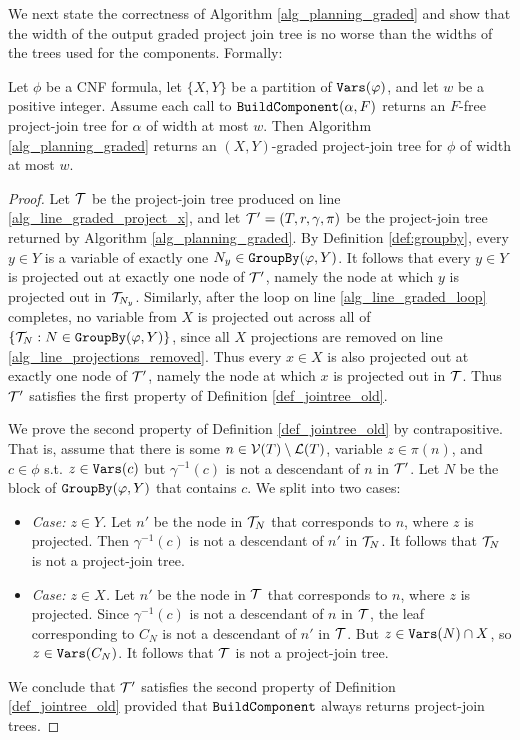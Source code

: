 We next state the correctness of Algorithm \ref{alg_planning_graded} and show that the width of the output graded project join tree is no worse than the widths of the trees used for the components. Formally:
\begin{theorem}
\label{thm:planning_graded_correctness}
Let $\phi$ be a CNF formula, let $\{X, Y\}$ be a partition of $\texttt{\upshape Vars}(\varphi)$, and let $w$ be a positive integer. 
Assume each call to $\texttt{\upshape BuildComponent}(\alpha, F)$ returns an $F$-free project-join tree for $\alpha$ of width at most $w$. 
Then Algorithm \ref{alg_planning_graded} returns an $(X,Y)$-graded project-join tree for $\phi$ of width at most $w$.
\end{theorem}
\begin{proof}
Let $\mathcal{T}$ be the project-join tree produced on line \ref{alg_line_graded_project_x}, and let $\mathcal{T}' = (T, r, \gamma, \pi)$ be the project-join tree returned by Algorithm \ref{alg_planning_graded}. 
By Definition \ref{def:groupby}, every $y \in Y$ is a variable of exactly one $N_y \in \texttt{\upshape GroupBy}(\varphi, Y)$. It follows that every $y \in Y$ is projected out at exactly one node of $\mathcal{T}'$, namely the node at which $y$ is projected out in $\mathcal{T}_{N_y}$. Similarly, after the loop on line \ref{alg_line_graded_loop} completes, no variable from $X$ is projected out across all of $\{\mathcal{T}_N : N \in \texttt{\upshape GroupBy}(\varphi, Y)\}$, since all $X$ projections are removed on line \ref{alg_line_projections_removed}. Thus every $x \in X$ is also projected out at exactly one node of $\mathcal{T}'$, namely the node at which $x$ is projected out in $\mathcal{T}$. Thus $\mathcal{T}'$ satisfies the first property of Definition \ref{def_jointree_old}.

We prove the second property of Definition \ref{def_jointree_old} by contrapositive. That is, assume that there is some $n \in \mathcal{V}(T) \setminus \mathcal{L}(T)$, variable $z \in \pi(n)$, and $c \in \phi$ s.t. $z \in \texttt{\upshape Vars}(c)$ but $\gamma^{-1}(c)$ is not a descendant of $n$ in $\mathcal{T}'$. Let $N$ be the block of $\texttt{\upshape GroupBy}(\varphi, Y)$ that contains $c$. We split into two cases:
\begin{itemize}
    \item \textit{Case: $z \in Y$.} Let $n'$ be the node in $\mathcal{T}_N$ that corresponds to $n$, where $z$ is projected. Then $\gamma^{-1}(c)$ is not a descendant of $n'$ in $\mathcal{T}_N$. It follows that $\mathcal{T}_N$ is not a project-join tree.
    \item \textit{Case: $z \in X$.} Let $n'$ be the node in $\mathcal{T}$ that corresponds to $n$, where $z$ is projected. Since  $\gamma^{-1}(c)$ is not a descendant of $n$ in $\mathcal{T}$, the leaf corresponding to $C_N$ is not a descendant of $n'$ in $\mathcal{T}$. But $z \in \texttt{\upshape Vars}(N) \cap X$, so $z \in \texttt{\upshape Vars}(C_N)$. It follows that $\mathcal{T}$ is not a project-join tree. 
\end{itemize} 
We conclude that $\mathcal{T}'$ satisfies the second property of Definition \ref{def_jointree_old} provided that $\texttt{\upshape BuildComponent}$ always returns project-join trees.


\end{proof}
